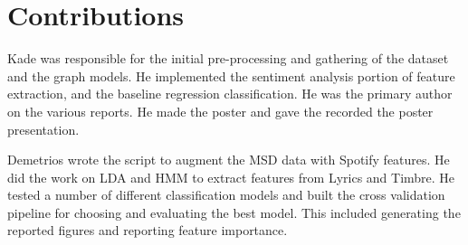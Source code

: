 \documentclass[acmtog]{acmart}
\begin{document}
\section{Contributions}
Kade was responsible for the initial pre-processing and gathering of the dataset and the graph models. He implemented the sentiment analysis portion of feature extraction, and the baseline regression classification. He was the primary author on the various reports. He made the poster and gave the recorded the poster presentation.

Demetrios wrote the script to augment the MSD data with Spotify features. He did the work on LDA and HMM to extract features from Lyrics and Timbre. He tested a number of different classification models and built the cross validation pipeline for choosing and evaluating the best model. This included generating the reported figures and reporting feature importance.  


{}

%
\end{document}
